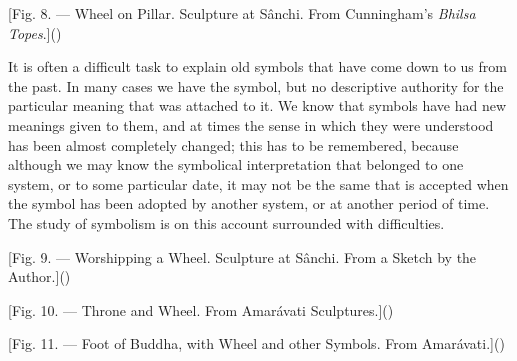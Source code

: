 \documentclass[a4paper, 11pt, oneside, polutonikogreek, english]{article}
\begin{document}
[Fig. 8. --- Wheel on Pillar. Sculpture at Sânchi. From Cunningham's \emph{Bhilsa Topes}.]()

It is often a difficult task to explain old symbols that have come down to us from the past. In many cases we have the symbol, but no descriptive authority for the particular meaning that was attached to it. We know that symbols have had new meanings given to them, and at times the sense in which they were understood has been almost completely changed; this has to be remembered, because although we may know the symbolical interpretation that belonged to one system, or to some particular date, it may not be the same that is accepted when the symbol has been adopted by another system, or at another period of time. The study of symbolism is on this account surrounded with difficulties.

[Fig. 9. --- Worshipping a Wheel. Sculpture at Sânchi. From a Sketch by the Author.]()

[Fig. 10. --- Throne and Wheel. From Amarávati Sculptures.]()

[Fig. 11. --- Foot of Buddha, with Wheel and other Symbols. From Amarávati.]()
\end{document}
